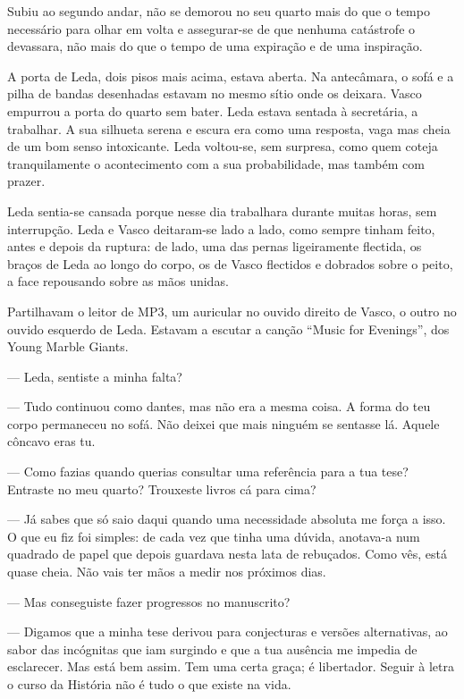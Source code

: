 Subiu ao segundo andar, não se demorou no seu quarto mais do que o tempo
necessário para olhar em volta e assegurar-se de que nenhuma
catástrofe o devassara, não mais do que o tempo de uma expiração e de
uma inspiração.

A porta de Leda, dois pisos mais acima, estava aberta. Na antecâmara, o
sofá e a pilha de bandas desenhadas estavam no mesmo sítio onde os
deixara. Vasco empurrou a porta do quarto sem bater. Leda estava sentada
à secretária, a trabalhar. A sua silhueta serena e escura era como uma
resposta, vaga mas cheia de um bom senso intoxicante. Leda voltou-se,
sem surpresa, como quem coteja tranquilamente o acontecimento com a sua
probabilidade, mas também com prazer.

Leda sentia-se cansada porque nesse dia trabalhara durante muitas
horas, sem interrupção. Leda e Vasco deitaram-se lado a lado, como
sempre tinham feito, antes e depois da ruptura: de lado, uma das pernas
ligeiramente flectida, os braços de Leda ao longo do corpo, os de Vasco
flectidos e dobrados sobre o peito, a face repousando sobre as mãos
unidas.

Partilhavam o leitor de MP3, um auricular no ouvido direito de
Vasco, o outro no ouvido esquerdo de Leda. Estavam a escutar a canção
``Music for Evenings'', dos Young Marble Giants.

--- Leda, sentiste a minha falta?

--- Tudo continuou como dantes, mas não era a mesma coisa. A forma do teu
  corpo permaneceu no sofá. Não deixei que mais ninguém se sentasse lá.
  Aquele côncavo eras tu.

--- Como fazias quando querias consultar uma referência para a tua tese?
  Entraste no meu quarto? Trouxeste livros cá para cima?

--- Já sabes que só saio daqui quando uma necessidade absoluta me força a
  isso. O que eu fiz foi simples: de cada vez que tinha uma dúvida,
  anotava-a num quadrado de papel que depois guardava nesta lata de
  rebuçados. Como vês, está quase cheia. Não vais ter mãos a medir nos
  próximos dias.

--- Mas conseguiste fazer progressos no manuscrito?

--- Digamos que a minha tese derivou para conjecturas e versões
  alternativas, ao sabor das incógnitas que iam surgindo e que a tua
  ausência me impedia de esclarecer. Mas está bem assim. Tem uma certa
  graça; é libertador. Seguir à letra o curso da História não é tudo o
  que existe na vida.

